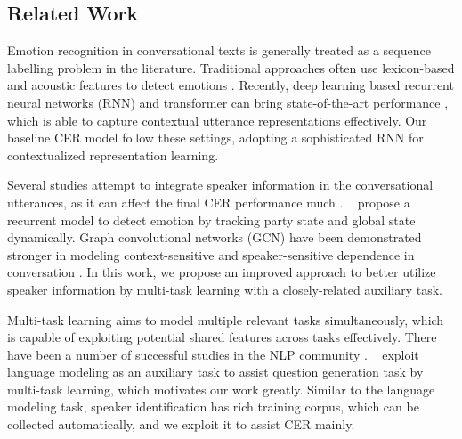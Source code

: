 \documentclass{article}
\def\newcite#1{\citeauthor{#1}~\shortcite{#1}}
\begin{document}
\begin{CJK}{UTF8}{gbsn}
\section{Related Work}

Emotion recognition in conversational texts is generally treated as a sequence labelling problem in the literature. 
Traditional approaches often use lexicon-based and acoustic features to detect emotions \cite{riley2004predicting,devillers2006real}. 
Recently, deep learning based recurrent neural networks (RNN) and transformer can bring state-of-the-art performance \cite{poria2017context,tzirakis2017end,zhong2019knowledge},
which is able to capture contextual utterance representations effectively. Our baseline CER model follow these settings, 
adopting a sophisticated RNN for contextualized representation learning.

Several studies attempt to integrate speaker information in the conversational utterances, as it can affect the final CER performance much \cite{Hazarika2018conversational,Hazarika2018icon}. 
\newcite{majumder2019dialoguernn} propose a recurrent model to detect emotion by tracking party state and global state dynamically. 
Graph convolutional networks (GCN) have been demonstrated stronger in modeling context-sensitive and speaker-sensitive dependence in conversation \cite{zhang2019Modeling,ghosal2019dialoguegcn}.
In this work, we propose an improved approach to better 
utilize speaker information by multi-task learning with a closely-related auxiliary task. 







Multi-task learning aims to model multiple relevant tasks
simultaneously, which is capable of exploiting potential shared features across tasks effectively. 
There have been a number of successful studies in the NLP community \cite{liu2017adversarial,ma2018modeling,xiao2018gated,pentyala2019multi,wu2019different}. 
\newcite{zhou2019multi} exploit language modeling as an auxiliary task to assist question generation task by multi-task learning, which motivates our work greatly. Similar to the language modeling task,
speaker identification has rich training corpus, which can be collected automatically,
and we exploit it to assist CER mainly. 





\end{CJK}
\end{document}
